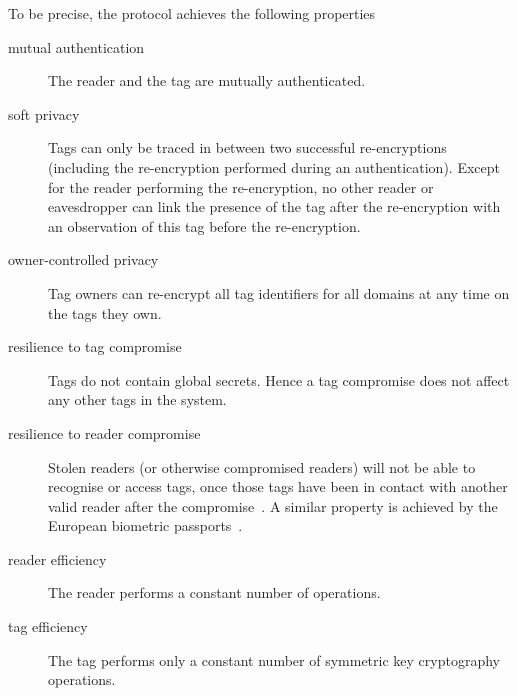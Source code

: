To be precise, the protocol achieves the following properties
\begin{description}
\item[mutual authentication]
  The reader and the tag are mutually authenticated.
\item[soft privacy]
  Tags can only be traced in between two successful
  re-encryptions (including the re-encryp\-tion performed during an
  authentication). Except for the reader performing the 
  re-encryption, no other reader or eavesdropper can link the presence of the 
  tag after the re-encryption with an observation of this tag before the
  re-encryption. 
\item[owner-controlled privacy]
  Tag owners can re-encrypt all tag identifiers for all domains at any time on the tags they own.
\item[resilience to tag compromise]
  Tags do not contain global secrets. Hence a tag compromise does not affect 
  any other tags in the system.
\item[resilience to reader compromise]
  Stolen readers (or otherwise compromised readers) will not be able to 
  recognise or access tags, once those tags have been in contact with another
  valid reader after the compromise~\cite{avoine2009compromised-readers}.
  A similar property is achieved by the European biometric
  passports~\cite{bsi2006extendedaccesscontrol,hoepman2006crossingborders}. 
\item[reader efficiency]
  The reader performs a constant number of operations.
\item[tag efficiency]
  The tag performs only a constant number of symmetric key cryptography
  operations. 
\end{description}


